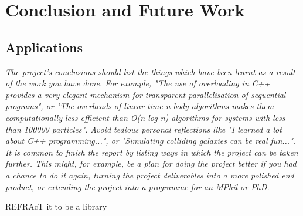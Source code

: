
\chapter{Conclusion and Future Work}

\label{ch:conclusions}

\section{Applications}


\emph{The project's conclusions should list the things which have been learnt as a result of the work you have done. For example, "The use of overloading in C++ provides a very elegant mechanism for transparent parallelisation of sequential programs", or "The overheads of linear-time n-body algorithms makes them computationally less efficient than O(n log n) algorithms for systems with less than 100000 particles". Avoid tedious personal reflections like "I learned a lot about C++ programming...", or "Simulating colliding galaxies can be real fun...". It is common to finish the report by listing ways in which the project can be taken further. This might, for example, be a plan for doing the project better if you had a chance to do it again, turning the project deliverables into a more polished end product, or extending the project into a programme for an MPhil or PhD.}


REFRAcT it to be a library 